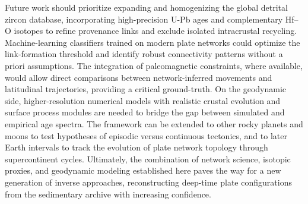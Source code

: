 \documentclass{article}
\begin{document}
Future work should prioritize expanding and homogenizing the global detrital zircon database, incorporating high-precision U-Pb ages and complementary Hf–O isotopes to refine provenance links and exclude isolated intracrustal recycling. Machine-learning classifiers trained on modern plate networks could optimize the link-formation threshold and identify robust connectivity patterns without a priori assumptions. The integration of paleomagnetic constraints, where available, would allow direct comparisons between network-inferred movements and latitudinal trajectories, providing a critical ground-truth. On the geodynamic side, higher-resolution numerical models with realistic crustal evolution and surface process modules are needed to bridge the gap between simulated and empirical age spectra. The framework can be extended to other rocky planets and moons to test hypotheses of episodic versus continuous tectonics, and to later Earth intervals to track the evolution of plate network topology through supercontinent cycles. Ultimately, the combination of network science, isotopic proxies, and geodynamic modeling established here paves the way for a new generation of inverse approaches, reconstructing deep-time plate configurations from the sedimentary archive with increasing confidence.



\end{document}
